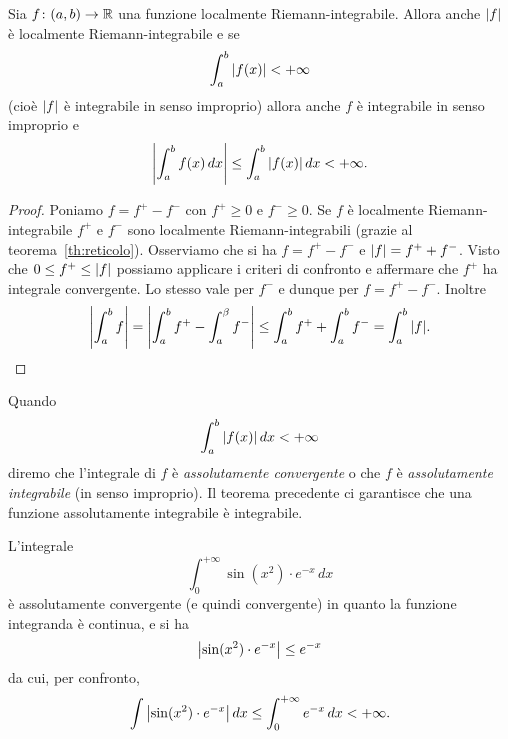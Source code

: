 \begin{theorem}
\label{th:convergenza_assoluta_integrale}
\mymark{**}%
Sia $f\colon (a,b)\to \mathbb R$ una funzione localmente Riemann-integrabile.
Allora anche ${\left|f\right|}$ è localmente Riemann-integrabile e se
\[
\int_a^b {\left|f(x)\right|} < +\infty
\]
(cioè ${\left|f\right|}$ è integrabile in senso improprio)
allora anche $f$ è integrabile in senso improprio e
\[
  {\left|\int_a^b f(x)\,dx\right|}
  \le \int_a^b {\left|f(x)\right|}\, dx < +\infty.
\]
\end{theorem}
%
%
\begin{proof}
Poniamo $f = f^+ - f^-$ con $f^+\ge 0$ e $f^-\ge 0$.
Se $f$ è localmente Riemann-integrabile
$f^+$ e $f^-$ sono localmente Riemann-integrabili
(grazie al teorema~\ref{th:reticolo}).
Osserviamo che si ha $f = f^+ - f^-$
e ${\left|f\right|} = f^+ + f^-$.
Visto che $0\le f^+ \le {\left|f\right|}$ possiamo
applicare i criteri di confronto e
affermare che $f^+$ ha integrale convergente.
Lo stesso vale per $f^-$ e dunque per $f=f^+ - f^-$.
Inoltre
\[
  {\left|\int_a^b f \right|}
  = {\left|\int_a^b f^+ - \int_a^\beta f^-\right|}
  \le \int_a^b f^+ + \int_a^b f^-
  = \int_a^b {\left|f\right|}.
\]
\end{proof}

\begin{definition}
%
%
%
%
%
Quando
\[
  \int_a^b {\left|f(x)\right|}\, dx <+\infty
\]
diremo che l'integrale di $f$ è \emph{assolutamente convergente}
o che $f$ è \emph{assolutamente integrabile} (in senso improprio).
Il teorema
precedente ci garantisce che una funzione assolutamente integrabile
è integrabile.
\end{definition}

\begin{example}
L'integrale
\[
  \int_0^{+\infty} \sin(x^2)\cdot e^{-x}\, dx
\]
è assolutamente convergente (e quindi convergente)
in quanto la funzione integranda è continua,
e si ha
\[
 {\left|\sin(x^2)\cdot e^{-x}\right|} \le e^{-x}
\]
da cui, per confronto,
\[
 \int {\left|\sin(x^2)\cdot e^{-x}\right|}\, dx  \le
  \int_0^{+\infty} e^{-x}\, dx < +\infty.
\]
\end{example}


